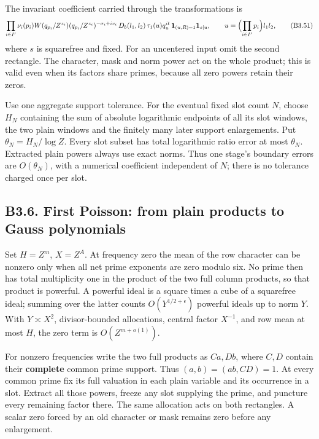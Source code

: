\documentclass[11pt,a4paper]{article}
\begin{document}
The invariant coefficient carried through the transformations is \[
\prod_{i\in I'}\nu_i(p_i)W(q_{p_i}/Z^{z_i})(q_{p_i}/Z^{z_i})^{-\sigma_i+iv_i}\,
D_b(l_1,l_2)\,\tau_1(u)q_u^{it}\,\mathbf1_{(u,R)=1}\mathbf1_{s\mid u},
\qquad u=\Bigl(\prod_{i\in I'}p_i\Bigr)l_1l_2,
\tag{B3.51}
\] where \(s\) is squarefree and fixed. For an uncentered input omit the
second rectangle. The character, mask and norm power act on the whole
product; this is valid even when its factors share primes, because all
zero powers retain their zeros.

Use one aggregate support tolerance. For the eventual fixed slot count
\(N\), choose \(H_N\) containing the sum of absolute logarithmic
endpoints of all its slot windows, the two plain windows and the
finitely many later support enlargements. Put \(\theta_N=H_N/\log Z\).
Every slot subset has total logarithmic ratio error at most
\(\theta_N\). Extracted plain powers always use exact norms. Thus one
stage's boundary errors are \(O(\theta_N)\), with a numerical
coefficient independent of \(N\); there is no tolerance charged once per
slot.

\hypertarget{b3.6.-first-poisson-from-plain-products-to-gauss-polynomials}{%
\subsection{B3.6. First Poisson: from plain products to Gauss
polynomials}\label{b3.6.-first-poisson-from-plain-products-to-gauss-polynomials}}

Set \(H=Z^m\), \(X=Z^A\). At frequency zero the mean of the row
character can be nonzero only when all net prime exponents are zero
modulo six. No prime then has total multiplicity one in the product of
the two full column products, so that product is powerful. A powerful
ideal is a square times a cube of a squarefree ideal; summing over the
latter counts \(O(Y^{1/2+\epsilon})\) powerful ideals up to norm \(Y\).
With \(Y\asymp X^2\), divisor-bounded allocations, central factor
\(X^{-1}\), and row mean at most \(H\), the zero term is
\(O(Z^{m+o(1)})\).

For nonzero frequencies write the two full products as \(Ca,\allowbreak{}Db\), where
\(C,\allowbreak{}D\) contain their \textbf{complete} common prime support. Thus
\((a,\allowbreak{}b)=(ab,\allowbreak{}CD)=1\). At every common prime fix its full valuation in
each plain variable and its occurrence in a slot. Extract all those
powers, freeze any slot supplying the prime, and puncture every
remaining factor there. The same allocation acts on both rectangles. A
scalar zero forced by an old character or mask remains zero before any
enlargement.
\end{document}
